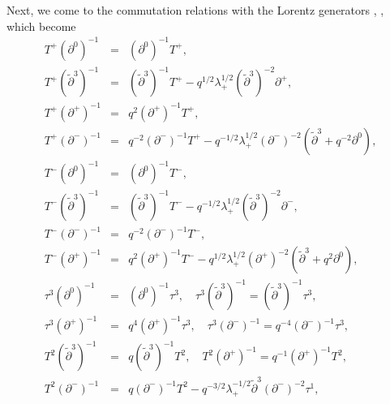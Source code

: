 \documentclass[a4paper,11pt,oneside]{article}
\begin{document}
Next, we come to the commutation relations with the Lorentz generators \cite
{OSWZ92}, \cite{SWZ91}, \cite{RW99} which become 
\begin{eqnarray}
T^{+}\left( \partial ^{0}\right) ^{-1} &=&\left( \partial ^{0}\right)
^{-1}T^{+}, \\
T^{+}\left( \tilde{\partial}^{3}\right) ^{-1} &=&\left( \tilde{\partial}%
^{3}\right) ^{-1}T^{+}-q^{1/2}\lambda _{+}^{1/2}\left( \tilde{\partial}%
^{3}\right) ^{-2}\partial ^{+},  \nonumber \\
T^{+}\left( \partial ^{+}\right) ^{-1} &=&q^{2}\left( \partial ^{+}\right)
^{-1}T^{+},  \nonumber \\
T^{+}\left( \partial ^{-}\right) ^{-1} &=&q^{-2}\left( \partial ^{-}\right)
^{-1}T^{+}-q^{-1/2}\lambda _{+}^{1/2}\left( \partial ^{-}\right) ^{-2}\left( 
\tilde{\partial}^{3}+q^{-2}\partial ^{0}\right) ,  \nonumber \\[0.16in]
T^{-}\left( \partial ^{0}\right) ^{-1} &=&\left( \partial ^{0}\right)
^{-1}T^{-}, \\
T^{-}\left( \tilde{\partial}^{3}\right) ^{-1} &=&\left( \tilde{\partial}%
^{3}\right) ^{-1}T^{-}-q^{-1/2}\lambda _{+}^{1/2}\left( \tilde{\partial}%
^{3}\right) ^{-2}\partial ^{-},  \nonumber \\
T^{-}\left( \partial ^{-}\right) ^{-1} &=&q^{-2}\left( \partial ^{-}\right)
^{-1}T^{-},  \nonumber \\
T^{-}\left( \partial ^{+}\right) ^{-1} &=&q^{2}\left( \partial ^{+}\right)
^{-1}T^{-}-q^{1/2}\lambda _{+}^{1/2}\left( \partial ^{+}\right) ^{-2}\left( 
\tilde{\partial}^{3}+q^{2}\partial ^{0}\right) ,  \nonumber \\[0.16in]
\tau ^{3}\left( \partial ^{0}\right) ^{-1} &=&\left( \partial ^{0}\right)
^{-1}\tau ^{3},\quad \tau ^{3}\left( \tilde{\partial}^{3}\right)
^{-1}=\left( \tilde{\partial}^{3}\right) ^{-1}\tau ^{3}, \\
\tau ^{3}\left( \partial ^{+}\right) ^{-1} &=&q^{4}\left( \partial
^{+}\right) ^{-1}\tau ^{3},\quad \tau ^{3}\left( \partial ^{-}\right)
^{-1}=q^{-4}\left( \partial ^{-}\right) ^{-1}\tau ^{3},  \nonumber \\[0.16in]
T^{2}\left( \tilde{\partial}^{3}\right) ^{-1} &=&q\left( \tilde{\partial}%
^{3}\right) ^{-1}T^{2},\quad T^{2}\left( \partial ^{+}\right)
^{-1}=q^{-1}\left( \partial ^{+}\right) ^{-1}T^{2}, \\
T^{2}\left( \partial ^{-}\right) ^{-1} &=&q\left( \partial ^{-}\right)
^{-1}T^{2}-q^{-3/2}\lambda _{+}^{-1/2}\tilde{\partial}^{3}\left( \partial
^{-}\right) ^{-2}\tau ^{1},  \nonumber \\

\end{eqnarray}
\end{document}
